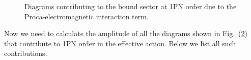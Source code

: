 \begin{figure}[t!]
    \begin{subfigure}[t]{0.22\textwidth}
        \centering
\caption{}
\label{fig9em}
    \end{subfigure}
    \caption{Diagrams contributing to the bound sector at 1PN order due to the Proca-electromagnetic interaction term.}
    \label{fig:my_label2}
\end{figure}
Now we need to calculate the amplitude of all the diagrams shown in Fig.~(\ref{fig:my_label2}) that contribute to 1PN order in the effective action. Below we list all such contributions. 
